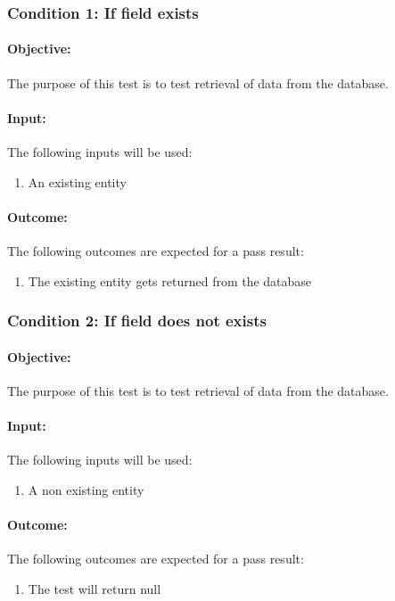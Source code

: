 \documentclass{article}
\begin{document}
\subsubsection{Condition 1: If field exists }
\paragraph{Objective:} The purpose of this test is to test retrieval of data from the database.
\paragraph{Input:} The following inputs will be used:
\begin{enumerate}
	\item An existing entity
\end{enumerate}
\paragraph{Outcome:} The following outcomes are expected for a pass result:
\begin{enumerate}
	\item The existing entity gets returned from the database
\end{enumerate}
\subsubsection{Condition 2: If field does not exists }
\paragraph{Objective:} The purpose of this test is to test retrieval of data from the database.
\paragraph{Input:} The following inputs will be used:
\begin{enumerate}
	\item A non existing entity 
\end{enumerate}
\paragraph{Outcome:} The following outcomes are expected for a pass result:
\begin{enumerate}
	\item The test will return null
\end{enumerate}
\end{document}
